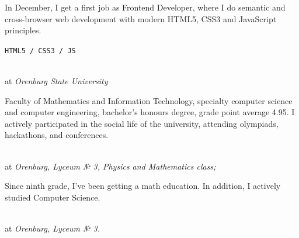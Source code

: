 In December, I get a first job as Frontend Developer, where I do semantic and cross-browser web development with modern HTML5,  CSS3 and JavaScript principles.
\SmallSep

\texttt{HTML5 / CSS3 / JS}

\clearpage
\framebreak
\framebreak



 \\
at \textit {Orenburg State University}

\SmallSep

Faculty of Mathematics and Information Technology, specialty computer science and computer engineering,  bachelor's honours degree, grade point average 4.95. I actively participated in the social life of the university, attending olympiads, hackathons, and conferences.

\SmallSep

 \\
at \textit {Orenburg, Lyceum № 3, Physics and Mathematics class;}
\SmallSep

Since ninth grade, I've been getting a math education. In addition, I actively studied Computer Science.

\SmallSep

 \\
at \textit {Orenburg, Lyceum № 3.}

\Sep




